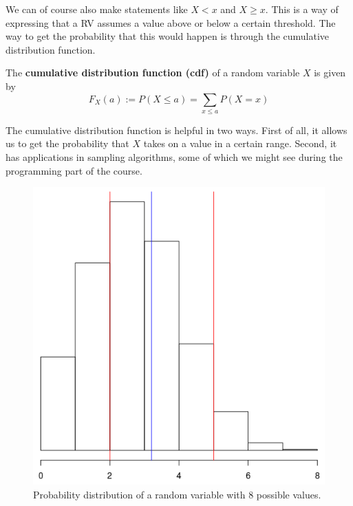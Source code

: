 \documentclass[a4paper,11pt,leqno]{report}
\begin{document}
We can of course also make statements
like $ X < x $ and $ X \geq x $. This is a way of expressing that a RV assumes a value above or below a certain
threshold. The way to get the probability that this would happen is through the cumulative distribution
function.

\newpage
\begin{Definition}
The \textbf{cumulative distribution function (cdf)} of a random variable $ X $ is given by
$$ F_{X}(a) := P(X \leq a) = {\underset{x \leq a}{\sum}}P(X=x) $$
\end{Definition}

The cumulative distribution function is helpful in two ways. First of all, it allows us to get the probability that
$ X $ takes on a value in a certain range. Second, it has applications in sampling algorithms, some of which we might
see during the programming part of the course.

\begin{figure}
\center
\includegraphics[scale=.3]{histogram.png}
\caption{Probability distribution of a random variable with $ 8 $ possible values.}
\label{binomplot}
\end{figure}
\end{document}
